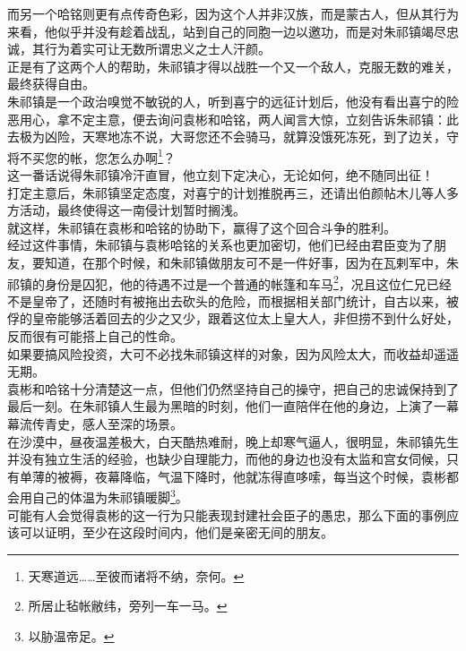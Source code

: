 \begin{multicols}{\theparacolNo}
而另一个哈铭则更有点传奇色彩，因为这个人并非汉族，而是蒙古人，但从其行为来看，他似乎并没有趁着战乱，站到自己的同胞一边以邀功，而是对朱祁镇竭尽忠诚，其行为着实可让无数所谓忠义之士人汗颜。\\

正是有了这两个人的帮助，朱祁镇才得以战胜一个又一个敌人，克服无数的难关，最终获得自由。\\

朱祁镇是一个政治嗅觉不敏锐的人，听到喜宁的远征计划后，他没有看出喜宁的险恶用心，拿不定主意，便去询问袁彬和哈铭，两人闻言大惊，立刻告诉朱祁镇：此去极为凶险，天寒地冻不说，大哥您还不会骑马，就算没饿死冻死，到了边关，守将不买您的帐，您怎么办啊\footnote{天寒道远……至彼而诸将不纳，奈何。}？\\

这一番话说得朱祁镇冷汗直冒，他立刻下定决心，无论如何，绝不随同出征！\\

打定主意后，朱祁镇坚定态度，对喜宁的计划推脱再三，还请出伯颜帖木儿等人多方活动，最终使得这一南侵计划暂时搁浅。\\

就这样，朱祁镇在袁彬和哈铭的协助下，赢得了这个回合斗争的胜利。\\

经过这件事情，朱祁镇与袁彬哈铭的关系也更加密切，他们已经由君臣变为了朋友，要知道，在那个时候，和朱祁镇做朋友可不是一件好事，因为在瓦剌军中，朱祁镇的身份是囚犯，他的待遇不过是一个普通的帐篷和车马\footnote{所居止毡帐敝纬，旁列一车一马。}，况且这位仁兄已经不是皇帝了，还随时有被拖出去砍头的危险，而根据相关部门统计，自古以来，被俘的皇帝能够活着回去的少之又少，跟着这位太上皇大人，非但捞不到什么好处，反而很有可能搭上自己的性命。\\

如果要搞风险投资，大可不必找朱祁镇这样的对象，因为风险太大，而收益却遥遥无期。\\

袁彬和哈铭十分清楚这一点，但他们仍然坚持自己的操守，把自己的忠诚保持到了最后一刻。在朱祁镇人生最为黑暗的时刻，他们一直陪伴在他的身边，上演了一幕幕流传青史，感人至深的场景。\\

在沙漠中，昼夜温差极大，白天酷热难耐，晚上却寒气逼人，很明显，朱祁镇先生并没有独立生活的经验，也缺少自理能力，而他的身边也没有太监和宫女伺候，只有单薄的被褥，夜幕降临，气温下降时，他就冻得直哆嗦，每当这个时候，袁彬都会用自己的体温为朱祁镇暖脚\footnote{以胁温帝足。}。\\

可能有人会觉得袁彬的这一行为只能表现封建社会臣子的愚忠，那么下面的事例应该可以证明，至少在这段时间内，他们是亲密无间的朋友。\\


\end{multicols}
